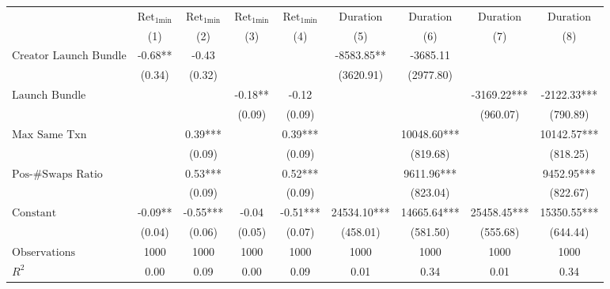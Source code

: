 \begin{tabular}{lcccccccc}
\hline
 & $\text{Ret}_{\text{1min}}$ & $\text{Ret}_{\text{1min}}$ & $\text{Ret}_{\text{1min}}$ & $\text{Ret}_{\text{1min}}$ & $\text{Duration}$ & $\text{Duration}$ & $\text{Duration}$ & $\text{Duration}$ \\
 & (1) & (2) & (3) & (4) & (5) & (6) & (7) & (8)\\
\hline
$\text{Creator Launch Bundle}$ & -0.68** & -0.43 &  &  & -8583.85** & -3685.11 &  &  \\
 & (0.34) & (0.32) &  &  & (3620.91) & (2977.80) &  &  \\
$\text{Launch Bundle}$ &  &  & -0.18** & -0.12 &  &  & -3169.22*** & -2122.33*** \\
 &  &  & (0.09) & (0.09) &  &  & (960.07) & (790.89) \\
$\text{Max Same Txn}$ &  & 0.39*** &  & 0.39*** &  & 10048.60*** &  & 10142.57*** \\
 &  & (0.09) &  & (0.09) &  & (819.68) &  & (818.25) \\
$\text{Pos-\#Swaps Ratio}$ &  & 0.53*** &  & 0.52*** &  & 9611.96*** &  & 9452.95*** \\
 &  & (0.09) &  & (0.09) &  & (823.04) &  & (822.67) \\
$\text{Constant}$ & -0.09** & -0.55*** & -0.04 & -0.51*** & 24534.10*** & 14665.64*** & 25458.45*** & 15350.55*** \\
 & (0.04) & (0.06) & (0.05) & (0.07) & (458.01) & (581.50) & (555.68) & (644.44) \\
$\text{Observations}$ & 1000 & 1000 & 1000 & 1000 & 1000 & 1000 & 1000 & 1000 \\
$R^2$ & 0.00 & 0.09 & 0.00 & 0.09 & 0.01 & 0.34 & 0.01 & 0.34 \\
\hline
\end{tabular}